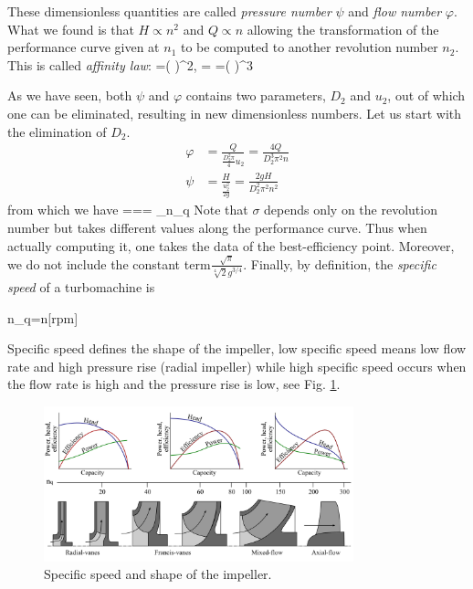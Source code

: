 These dimensionless quantities are called \emph{pressure number} $\psi$ and \emph{flow number} $\varphi$. What we found is that $H \propto n^2$ and $Q \propto n$ allowing the transformation of the performance curve given at $n_1$ to be computed to another revolution number $n_2$. This is called \emph{affinity law}:
%
\beq
{}=\left( \right)^2, \quad {}= \quad \rightarrow \quad {}=\left( \right)^3
\eeq

As we have seen, both $\psi$ and $\varphi$ contains two parameters, $D_2$ and $u_2$, out of which one can be eliminated, resulting in new dimensionless numbers. Let us start with the elimination of $D_2$.
%
\begin{align}
\varphi&=\frac{Q}{\frac{D_2^2 \pi}{4}u_2}=\frac{4 Q}{D_2^3 \pi^2 n}\\
\psi&=\frac{H}{ \frac{u_2^2}{2g}}=\frac{2g H}{ D_2^2 \pi^2 n^2}
\end{align}
%
from which we have
%
\beq
\sigma=== _{n_q}
\eeq
%
Note that $\sigma$ depends only on the revolution number but takes different values along the performance curve. Thus when actually computing it, one takes the data of the best-efficiency point. Moreover, we do not include the constant term$ \frac{\sqrt{\pi}}{\sqrt[4]{2} g^{3/4}}$. Finally, by definition, the \emph{specific speed} of a turbomachine is

\beq
n_q=n[rpm]
\eeq

Specific speed defines the shape of the impeller, low specific speed means low flow rate and high pressure rise (radial impeller) while high specific speed occurs when the flow rate is high and the pressure rise is low, see Fig. \ref{fig:nq}.

\begin{figure}[ht]
\begin{center}
\includegraphics[width=0.8\textwidth]{figs/nq_eng.png}
\caption{\label{fig:nq}Specific speed and shape of the impeller.}
\end{center}
\end{figure}

